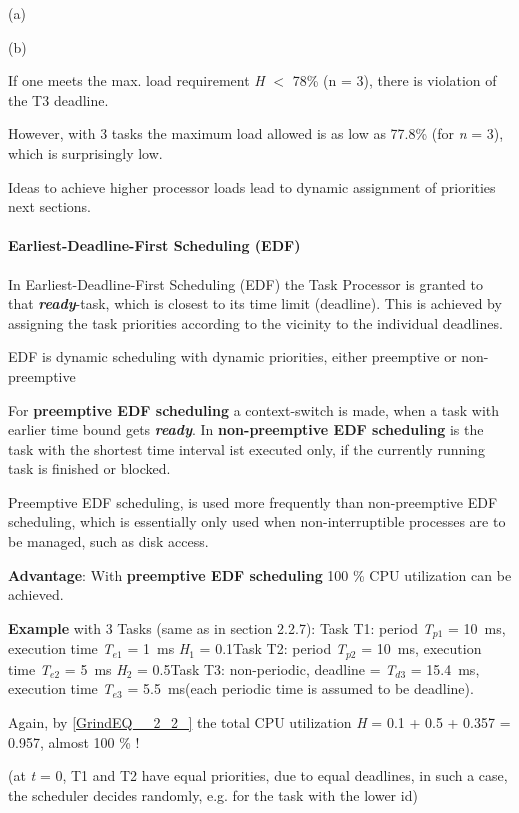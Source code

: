 (a)

(b)

If one meets the max. load requirement \textit{H} $\mathrm{<}$ 78\% (n = 3), there is violation of the T3 deadline.

However, with 3 tasks the maximum load allowed is as low as 77.8\% (for \textit{n} = 3), which is surprisingly low.

Ideas to achieve higher processor loads lead to dynamic assignment of priorities  next sections.

\paragraph{  Earliest-Deadline-First Scheduling (EDF)}

In Earliest-Deadline-First Scheduling (EDF) the Task Processor is granted to that \textbf{\textit{ready}}-task, which is closest to its time limit (deadline). This is achieved by assigning the task priorities according to the vicinity to the individual deadlines.

EDF is dynamic scheduling with dynamic priorities, either preemptive or non-preemptive

For \textbf{preemptive EDF scheduling} a context-switch is made, when a task with earlier time bound gets \textbf{\textit{ready}}. In \textbf{non-preemptive EDF scheduling} is the task with the shortest time interval ist executed only, if the currently running task is finished or blocked.

Preemptive EDF scheduling, is used more frequently than non-preemptive EDF scheduling, which is essentially only used when non-interruptible processes are to be managed, such as disk access.

\textbf{Advantage}: With \textbf{preemptive EDF scheduling }100 \% CPU utilization can be achieved. 

\textbf{Example} with 3 Tasks (same as in section 2.2.7): Task T1: period \textit{T}${}_{p1}$ = 10~ms, execution time \textit{T}${}_{e1}$ = 1~ms  \textit{H}${}_{1}$ = 0.1Task T2: period \textit{T}${}_{p2}$ = 10~ms, execution time\textit{ T}${}_{e2}$ = 5~ms  \textit{H}${}_{2}$ = 0.5Task T3: non-periodic, deadline = \textit{T}${}_{d3}$ = 15.4~ms, execution time\textit{ T}${}_{e3}$ = 5.5~ms(each periodic time is assumed to be deadline).

Again, by \eqref{GrindEQ__2_2_} the total CPU utilization \textit{H} = 0.1 + 0.5 + 0.357 = 0.957, almost 100 \% !

(at \textit{t} = 0, T1 and T2 have equal priorities, due to equal deadlines, in such a case, the scheduler decides randomly, e.g. for the task with the lower id)

